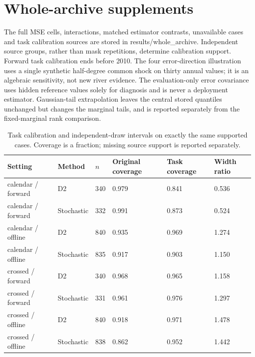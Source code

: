 \section{Whole-archive supplements}
The full MSE cells, interactions, matched estimator contrasts, unavailable cases and task calibration sources are stored in results/whole\_archive. Independent source groups, rather than mask repetitions, determine calibration support. Forward task calibration ends before 2010. The four error-direction illustration uses a single synthetic half-degree common shock on thirty annual values; it is an algebraic sensitivity, not new river evidence. The evaluation-only error covariance uses hidden reference values solely for diagnosis and is never a deployment estimator. Gaussian-tail extrapolation leaves the central stored quantiles unchanged but changes the marginal tails, and is reported separately from the fixed-marginal rank comparison.
\begin{table}[p]\centering\small
\caption{Task calibration and independent-draw intervals on exactly the same supported cases. Coverage is a fraction; missing source support is reported separately.}\label{tab:task-calibration}
\begin{tabular}{llllll}
\toprule
Setting & Method & $n$ & Original coverage & Task coverage & Width ratio\\\midrule
calendar / forward & D2 & 340 & 0.979 & 0.841 & 0.536\\
calendar / forward & Stochastic & 332 & 0.991 & 0.873 & 0.524\\
calendar / offline & D2 & 840 & 0.935 & 0.969 & 1.274\\
calendar / offline & Stochastic & 835 & 0.917 & 0.903 & 1.150\\
crossed / forward & D2 & 340 & 0.968 & 0.965 & 1.158\\
crossed / forward & Stochastic & 331 & 0.961 & 0.976 & 1.297\\
crossed / offline & D2 & 840 & 0.918 & 0.971 & 1.478\\
crossed / offline & Stochastic & 838 & 0.862 & 0.952 & 1.442\\
\bottomrule\end{tabular}
\end{table}
